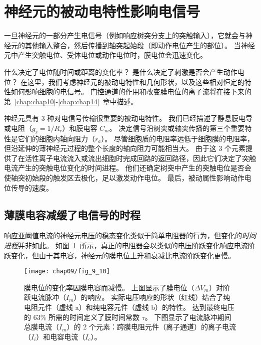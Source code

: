 \section{神经元的被动电特性影响电信号}

一旦神经元的一部分产生电信号（例如响应树突分支上的突触输入），它就会与神经元的其他输入整合，然后传播到轴突起始段（即动作电位产生的部位）。
当神经元中产生突触电位、受体电位或动作电位时，膜电位会迅速变化。


什么决定了电位随时间或距离的变化率？
是什么决定了刺激是否会产生动作电位？
在这里，我们考虑神经元的被动电特性和几何形状，以及这些相对恒定的特性如何影响细胞的电信号。 
门控通道的作用和改变膜电位的离子流将在接下来的第~\ref{chap:chap10}-\ref{chap:chap14}~章中描述。


神经元具有 3 种对电信号传输很重要的被动电特性。
我们已经描述了静息膜电导或电阻（$g_r = 1 / R_r$）和膜电容 $C_m$。
决定信号沿树突或轴突传播的第三个重要特性是它们的细胞内轴向阻力（$r_a$）。 
尽管细胞质的电阻率远低于细胞膜的电阻率，但沿延伸的薄神经元过程的整个长度的轴向阻力可能相当大。
由于这 3 个元素提供了在活性离子电流流入或流出细胞时完成回路的返回路径，因此它们决定了突触电流产生的突触电位变化的时间进程。
他们还确定树突中产生的突触电位是否会使轴突初始段的触发区去极化，足以激发动作电位。
最后，被动属性影响动作电位传导的速度。


\subsection{薄膜电容减缓了电信号的时程}

响应亚阈值电流的神经元电压的稳态变化类似于简单电阻器的行为，但变化的\textit{时间进程}并非如此。 
如图~\ref{fig:9_10}~所示，真正的电阻器会以类似的电压阶跃变化响应电流阶跃变化，但由于其电容，神经元的膜电位上升和衰减比电流阶跃变化更慢。


\begin{figure}[htbp]
	\centering
	\texttt{[image: chap09/fig\_9\_10]}
	\caption{膜电位的变化率因膜电容而减慢。
		上图显示了膜电位（$\Delta V_m$）对阶跃电流脉冲（$I_m$）的响应。
		实际电压响应的形状（红线）结合了纯电阻元件（虚线 a）和纯电容元件（虚线 b）的特性。
		达到最终电压的 63\% 所需的时间定义了膜时间常数 $\tau$。
		下图显示了电流脉冲期间总膜电流（$I_m$）的 2 个元素：跨膜电阻元件（离子通道）的离子电流（$I_i$）和电容电流（$I_c$）。}
	\label{fig:9_10}
\end{figure}


